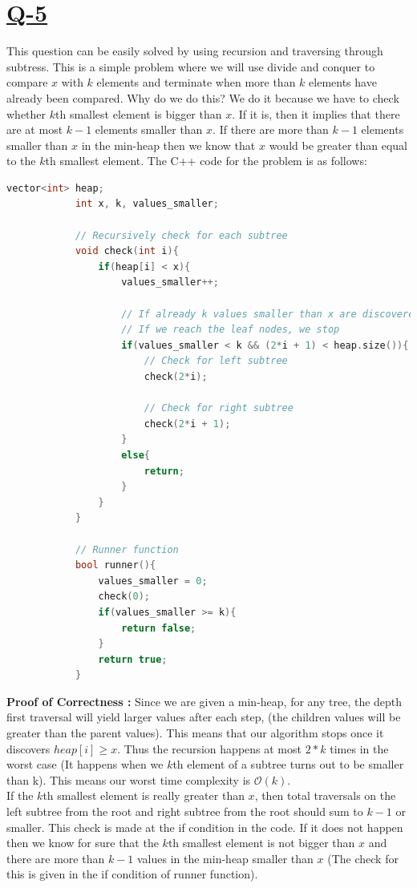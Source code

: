 \documentclass[14pt]{article}
\begin{document}
	\section*{\underline{Q-5}}
		This question can be easily solved by using recursion and traversing through subtress. This is a simple problem where we will use divide and conquer to compare $x$ with $k$ elements and terminate when more than $k$ elements have already been compared. Why do we do this? We do it because we have to check whether $k$th smallest element is bigger than $x$. If it is, then it implies that there are at most $k-1$ elements smaller than $x$. If there are more than $k-1$ elements smaller than $x$ in the min-heap then we know that $x$ would be greater than equal to the $k$th smallest element. The C++ code for the problem is as follows:
		\begin{lstlisting}[language=C++]
			vector<int> heap;
			int x, k, values_smaller;
			
			// Recursively check for each subtree
			void check(int i){
				if(heap[i] < x){
					values_smaller++;
					
					// If already k values smaller than x are discovered then we stop 
					// If we reach the leaf nodes, we stop
					if(values_smaller < k && (2*i + 1) < heap.size()){
						// Check for left subtree
						check(2*i);
						
						// Check for right subtree
						check(2*i + 1);
					}
					else{
						return;
					}
				}
			}
			
			// Runner function
			bool runner(){
				values_smaller = 0;
				check(0);
				if(values_smaller >= k){
					return false;
				}
				return true;
			}
		\end{lstlisting}
		\textbf{Proof of Correctness : }Since we are given a min-heap, for any tree, the depth first traversal will yield larger values after each step, (the children values will be greater than the parent values). This means that our algorithm stops once it discovers $heap[i] \geq x$. Thus the recursion happens at most $2*k$ times in the worst case (It happens when we $k$th element of a subtree turns out to be smaller than k). This means our worst time complexity is $\mathcal{O}(k)$.\\
		If the $k$th smallest element is really greater than $x$, then total traversals on the left subtree from the root and right subtree from the root should sum to $k-1$ or smaller. This check is made at the if condition in the code. If it does not happen then we know for sure that the $k$th smallest element is not bigger than $x$ and there are more than $k-1$ values in the min-heap smaller than $x$ (The check for this is given in the if condition of runner function).
		
	
\end{document}
